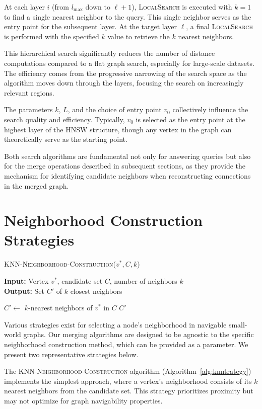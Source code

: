 \documentclass{article}
\begin{document}
At each layer $i$ (from $l_{\max}$ down to $\ell+1$), \textsc{LocalSearch} is executed with $k=1$ to find a single nearest neighbor to the query. This single neighbor serves as the entry point for the subsequent layer. At the target layer $\ell$, a final \textsc{LocalSearch} is performed with the specified $k$ value to retrieve the $k$ nearest neighbors.

This hierarchical search significantly reduces the number of distance computations compared to a flat graph search, especially for large-scale datasets. The efficiency comes from the progressive narrowing of the search space as the algorithm moves down through the layers, focusing the search on increasingly relevant regions.

The parameters $k$, $L$, and the choice of entry point $v_0$ collectively influence the search quality and efficiency. Typically, $v_0$ is selected as the entry point at the highest layer of the HNSW structure, though any vertex in the graph can theoretically serve as the starting point.

Both search algorithms are fundamental not only for answering queries but also for the merge operations described in subsequent sections, as they provide the mechanism for identifying candidate neighbors when reconstructing connections in the merged graph.

\section{Neighborhood Construction Strategies}

\begin{algorithm}
\caption{\textsc{KNN-Neighborhood-Construction}($v^*, C, k$)}\label{alg:knntrategy}
\textbf{Input:} Vertex $v^*$, candidate set $C$, number of neighbors $k$ \\
\textbf{Output:} Set $C'$ of $k$ closest neighbors
\begin{algorithmic}[1]
\State $C' \gets$ $k$-nearest neighbors of $v^*$ in $C$
\State \Return $C'$
\end{algorithmic}
\end{algorithm}

Various strategies exist for selecting a node's neighborhood in navigable small-world graphs. Our merging algorithms are designed to be agnostic to the specific neighborhood construction method, which can be provided as a parameter. We present two representative strategies below.

The \textsc{KNN-Neighborhood-Construction} algorithm (Algorithm~\ref{alg:knntrategy}) implements the simplest approach, where a vertex's neighborhood consists of its $k$ nearest neighbors from the candidate set. This strategy prioritizes proximity but may not optimize for graph navigability properties.
\end{document}
